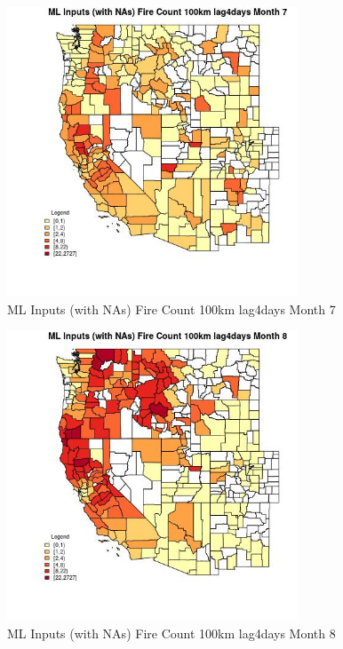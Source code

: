 \begin{figure} 
\centering  
\includegraphics[width=0.77\textwidth]{Code_Outputs/Report_ML_input_PM25_Step4_part_f_de_duplicated_aves_prioritize_24hr_obswNAs_CountyFire_Count_100km_lag4daysmedianMonth7.jpg} 
\caption{\label{fig:Report_ML_input_PM25_Step4_part_f_de_duplicated_aves_prioritize_24hr_obswNAsCountyFire_Count_100km_lag4daysmedianMonth7}ML Inputs (with NAs) Fire Count 100km lag4days Month 7} 
\end{figure} 
 

\begin{figure} 
\centering  
\includegraphics[width=0.77\textwidth]{Code_Outputs/Report_ML_input_PM25_Step4_part_f_de_duplicated_aves_prioritize_24hr_obswNAs_CountyFire_Count_100km_lag4daysmedianMonth8.jpg} 
\caption{\label{fig:Report_ML_input_PM25_Step4_part_f_de_duplicated_aves_prioritize_24hr_obswNAsCountyFire_Count_100km_lag4daysmedianMonth8}ML Inputs (with NAs) Fire Count 100km lag4days Month 8} 
\end{figure} 
 

